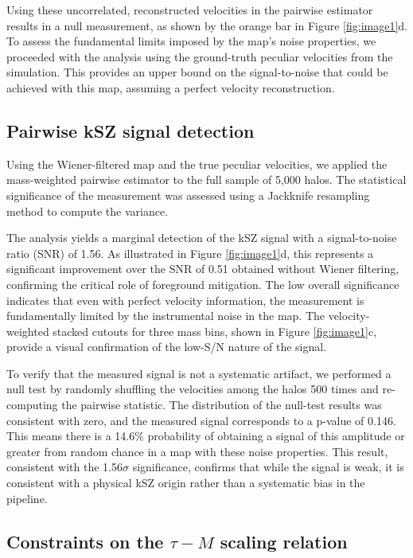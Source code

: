 \documentclass[]{article}
\begin{document}
Using these uncorrelated, reconstructed velocities in the pairwise estimator results in a null measurement, as shown by the orange bar in Figure \ref{fig:image1}d. To assess the fundamental limits imposed by the map's noise properties, we proceeded with the analysis using the ground-truth peculiar velocities from the simulation. This provides an upper bound on the signal-to-noise that could be achieved with this map, assuming a perfect velocity reconstruction.

\subsection{Pairwise kSZ signal detection}

Using the Wiener-filtered map and the true peculiar velocities, we applied the mass-weighted pairwise estimator to the full sample of 5,000 halos. The statistical significance of the measurement was assessed using a Jackknife resampling method to compute the variance.

The analysis yields a marginal detection of the kSZ signal with a signal-to-noise ratio (SNR) of 1.56. As illustrated in Figure \ref{fig:image1}d, this represents a significant improvement over the SNR of 0.51 obtained without Wiener filtering, confirming the critical role of foreground mitigation. The low overall significance indicates that even with perfect velocity information, the measurement is fundamentally limited by the instrumental noise in the map. The velocity-weighted stacked cutouts for three mass bins, shown in Figure \ref{fig:image1}c, provide a visual confirmation of the low-S/N nature of the signal.

To verify that the measured signal is not a systematic artifact, we performed a null test by randomly shuffling the velocities among the halos 500 times and re-computing the pairwise statistic. The distribution of the null-test results was consistent with zero, and the measured signal corresponds to a p-value of 0.146. This means there is a 14.6\% probability of obtaining a signal of this amplitude or greater from random chance in a map with these noise properties. This result, consistent with the 1.56$\sigma$ significance, confirms that while the signal is weak, it is consistent with a physical kSZ origin rather than a systematic bias in the pipeline.

\subsection{Constraints on the $\tau-M$ scaling relation}
\end{document}
